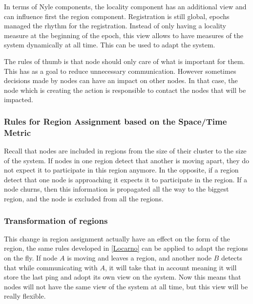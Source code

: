 \documentclass[a4paper,11pt,oneside]{report}
\begin{document}
In terms of Nyle components, the locality component has an additional view and
can influence first the region component. Registration is still global, epochs
managed the rhythm for the registration. Instead of only having a locality
measure at the beginning of the epoch, this view allows to have measures of the
system dynamically at all time. 
This can be used to adapt the system.

The rules of thumb is that node should only care of what is important for them.
This has as a goal to reduce unnecessary communication. However sometimes
decisions made by nodes can have an impact on other nodes. In that case, the
node which is creating the action is responsible to contact the nodes that will
be impacted.

\subsubsection{Rules for Region Assignment based on the Space/Time Metric}
Recall that nodes are included in regions from the size of their cluster to the
size of the system.  If nodes in one region detect that another is moving
apart, they do not expect it to participate in this region anymore. In the
opposite, if a region detect that one node is approaching it expects it to
participate in the region.  If a node churns, then this information is
propagated all the way to the biggest region, and the node is excluded from all
the regions. 

\subsubsection{Transformation of regions}
This change in region assignment actually have an effect on the form of the
region, the same rules developed in \autoref{Locarno} can be applied to adapt
the regions on the fly. If node $A$ is moving and leaves a region, and another
node $B$ detects that while communicating with $A$, it will take that in
account meaning it will store the last ping and adopt its own view on the
system. Now this means that nodes will not have the same view of the system at
all time, but this view will be really flexible. 

\end{document}
